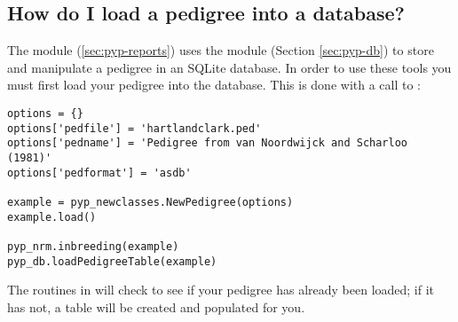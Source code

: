 \subsection{How do I load a pedigree into a database?}
\label{sec:howto-load-pedigree-db}
The  module (\ref{sec:pyp-reports}) uses the  module (Section \ref{sec:pyp-db})
to store and manipulate a pedigree in an SQLite database.  In order to use these tools you must first load your pedigree into
the database.  This is done with a call to :
\begin{verbatim}
options = {}
options['pedfile'] = 'hartlandclark.ped'
options['pedname'] = 'Pedigree from van Noordwijck and Scharloo (1981)'
options['pedformat'] = 'asdb'

example = pyp_newclasses.NewPedigree(options)
example.load()

pyp_nrm.inbreeding(example)
pyp_db.loadPedigreeTable(example)
\end{verbatim}
The routines in  will check to see if your pedigree has already been loaded; if it
has not, a table will be created and populated for you.
